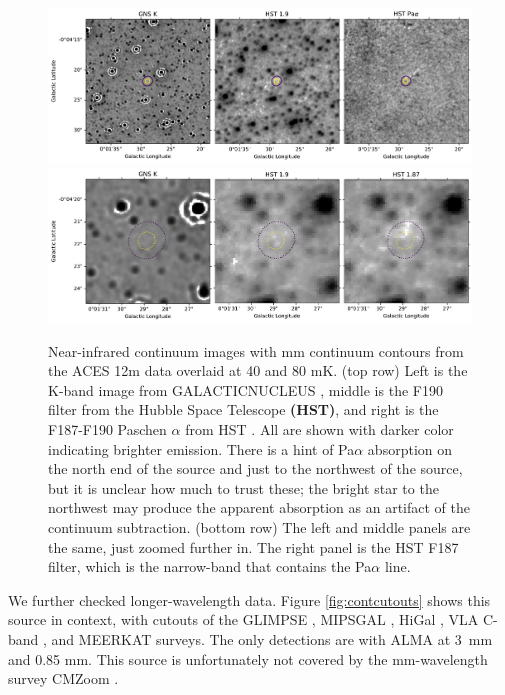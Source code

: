 \documentclass[]{aastex631}
\newcommand{\threemm}{3~mm\xspace}
\def\rr#1{\textbf{#1}}
\begin{document}
\begin{figure}
    \centering
    \includegraphics[width=\textwidth]{figures/HST_GNS_zoomout.pdf}
    \includegraphics[width=\textwidth]{figures/HST_GNS_zoomin.pdf}
    \caption{Near-infrared continuum images with mm continuum contours from the ACES 12m data overlaid at 40 and 80 mK.
    (top row)
    Left is the K-band image from GALACTICNUCLEUS \citep{Nogueras-Lara2018,Nogueras-Lara2019}, middle is the F190 filter from the Hubble Space Telescope \rr{(HST)},
    and right is the F187-F190 Paschen $\alpha$ from HST \citep{Dong2011}.
    All are shown with darker color indicating brighter emission.
    There is a hint of Pa$\alpha$ absorption on the north end of the source and just to the northwest of the source, but it is unclear how much to trust these; the bright star to the northwest may produce the apparent absorption as an artifact of the continuum subtraction.
    (bottom row) The left and middle panels are the same, just zoomed further in.
    The right panel is the HST F187 filter, which is the narrow-band that contains the Pa$\alpha$ line. 
    }
    \label{fig:nircontinuum}
\end{figure}

We further checked longer-wavelength data.
Figure \ref{fig:contcutouts} shows this source in context, with cutouts of the GLIMPSE \citep{Churchwell2009}, MIPSGAL \citep{Carey2009}, HiGal \citep{Molinari2010}, VLA C-band \citep{Lu2019}, and MEERKAT \citep{Heywood2022} surveys.
The only detections are with ALMA at \threemm and 0.85 mm.
This source is unfortunately not covered by the mm-wavelength survey CMZoom \citep{Battersby2020}.
\end{document}
